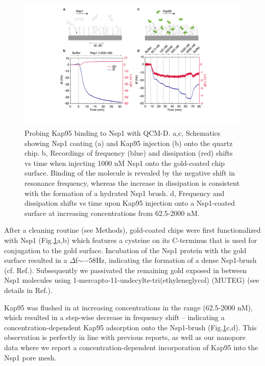 \begin{figure}[!htbp]
	\centering
	\includegraphics[width=1\linewidth]{figures/Figure7.3.pdf}
	\caption{Probing Kap95 binding to Nsp1 with QCM-D. a,c,  Schematics showing Nsp1 coating (a) and Kap95 injection (b) onto the quartz chip. b, Recordings of frequency (blue) and dissipation (red) shifts vs time when injecting 1000 nM Nsp1 onto the gold-coated chip surface. Binding of the molecule is revealed by the negative shift in resonance frequency, whereas the increase in dissipation is consistent with the formation of a hydrated Nsp1 brush. d, Frequency and dissipation shifts vs time upon Kap95 injection onto a Nsp1-coated surface at increasing concentrations from 62.5-2000 nM.}
	\label{fig:fig7.3}
\end{figure}

\noindent After a cleaning routine (see Methods), gold-coated chips were first functionalized with Nsp1 (Fig.\ref{fig:fig7.3}a,b) which features a cysteine on its C-terminus that is used for conjugation to the gold surface. Incubation of the Nsp1 protein with the gold surface resulted in a $\Delta$f$\sim-58$Hz, indicating the formation of a dense Nsp1-brush (cf. Ref.\cite{Eisele2018}). Subsequently we passivated the remaining gold exposed in between Nsp1 molecules using 1-mercapto-11-undecylte-tri(ethyleneglycol) (MUTEG) (see details in Ref.\cite{Fragasso2021}).

Kap95 was flushed in at increasing concentrations in the range (62.5-2000 nM), which resulted in a step-wise decrease in frequency shift – indicating a concentration-dependent Kap95 adsorption onto the Nsp1-brush (Fig.\ref{fig:fig7.3}c,d). This observation is perfectly in line with previous reports\cite{Eisele2010a,Wagner2015}, as well as our nanopore data where we report a concentration-dependent incorporation of Kap95 into the Nsp1 pore mesh. 


